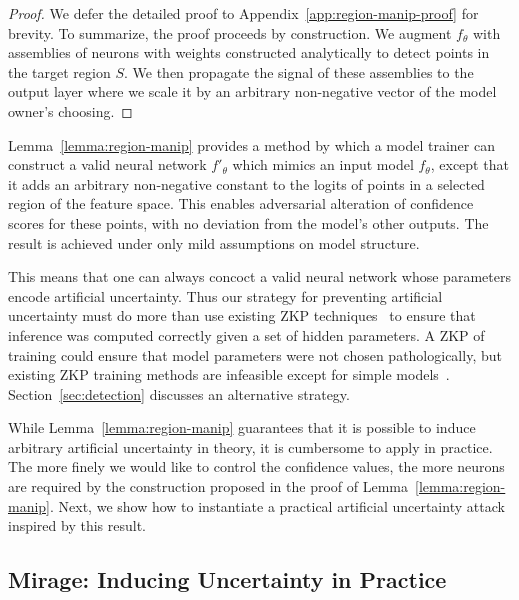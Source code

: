 \begin{proof} We defer the detailed proof to Appendix~\ref{app:region-manip-proof} for brevity. To summarize, the proof proceeds by construction. We augment $f_{\theta}$ with assemblies of neurons with weights constructed analytically to detect points in the target region $S$. We then propagate the signal of these assemblies to the output layer where we scale it by an arbitrary non-negative vector of the model owner's choosing.
\end{proof}

Lemma~\ref{lemma:region-manip} provides a method by which a model trainer can construct a valid neural network $f'_{\theta}$ which mimics an input model $f_{\theta}$, except that it adds an arbitrary non-negative constant to the logits of points in a selected region of the feature space. This enables adversarial alteration of confidence scores for these points, with no deviation from the model's other outputs. The result is achieved under only mild assumptions on model structure.

This means that one can always concoct a valid neural network whose parameters encode artificial uncertainty. Thus our strategy for preventing artificial uncertainty must do more than use existing ZKP techniques~\cite{weng2021mystique,sun2024zkllm} to ensure that inference was computed correctly given a set of hidden parameters. A ZKP of training could ensure that model parameters were not chosen pathologically, but existing ZKP training methods are infeasible except for simple models~\cite{garg2023experimenting}. Section~\ref{sec:detection} discusses an alternative strategy.

While Lemma~\ref{lemma:region-manip} guarantees that it is possible to induce arbitrary artificial uncertainty in theory, it is cumbersome to apply in practice. The more finely we would like to control the confidence values, the more neurons are required by the construction proposed in the proof of Lemma~\ref{lemma:region-manip}. Next, we show how to instantiate a practical artificial uncertainty attack inspired by this result. 

\subsection{Mirage: Inducing Uncertainty in Practice} \label{sec:uncertainty-training}

